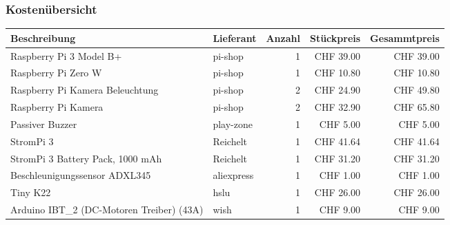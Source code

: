 \documentclass[../../main.tex]{subfiles}
\begin{document}
\subsubsection{Kostenübersicht}


\begin{table}[H] \centering
    \begin{tabular}{|p{6cm}|l|r|r|r|}
    \hline
    \textbf{Beschreibung}                                   & \textbf{Lieferant} & \textbf{Anzahl} & \textbf{Stückpreis} & \textbf{Gesammtpreis} \\ \hline
    Raspberry Pi 3 Model B+                                 & pi-shop            & 1               & CHF 39.00           & CHF 39.00             \\ \hline
    Raspberry Pi Zero W                                     & pi-shop            & 1               & CHF 10.80           & CHF 10.80             \\ \hline
    Raspberry Pi Kamera Beleuchtung                         & pi-shop            & 2               & CHF 24.90           & CHF 49.80             \\ \hline
    Raspberry Pi Kamera                                     & pi-shop            & 2               & CHF 32.90           & CHF 65.80             \\ \hline
    Passiver Buzzer                                         & play-zone          & 1               & CHF 5.00            & CHF 5.00              \\ \hline
    StromPi 3                                               & Reichelt           & 1               & CHF 41.64           & CHF 41.64             \\ \hline
    StromPi 3 Battery Pack, 1000 mAh                        & Reichelt           & 1               & CHF 31.20           & CHF 31.20             \\ \hline
    Beschleunigungssensor ADXL345                           & aliexpress         & 1               & CHF 1.00            & CHF 1.00              \\ \hline
    Tiny K22                                                & hslu               & 1               & CHF 26.00           & CHF 26.00             \\ \hline
    Arduino IBT\_2 (DC-Motoren Treiber) (43A)               & wish               & 1               & CHF 9.00            & CHF 9.00              \\ \hline

\end{tabular}
\end{table}
\end{document}
